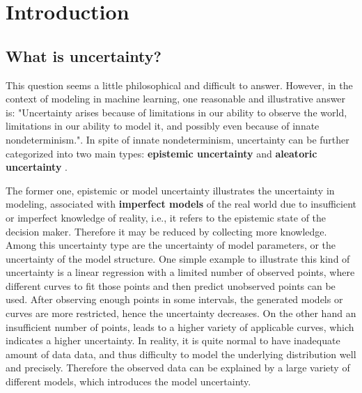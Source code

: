 \chapter{Introduction}
\setcounter{page}{1}%
\thispagestyle{empty}

\section{What is uncertainty?}
This question seems a little philosophical and difficult to answer. However, in the context of modeling in machine learning, one reasonable and illustrative answer is: "Uncertainty arises because of limitations in our ability to observe the world, limitations in our ability to model it, and possibly even because of innate nondeterminism."\cite{koller2009probabilistic}. In spite of innate nondeterminism, uncertainty can be further categorized into two main types: \textbf{epistemic uncertainty} and \textbf{aleatoric uncertainty} \cite{der2009aleatory, senge2014reliable, kendall2017uncertainties}. 

The former one, epistemic or model uncertainty illustrates the uncertainty in modeling, associated with \textbf{imperfect models} of the real world due to insufficient or imperfect knowledge of reality, i.e., it refers to the epistemic state of the decision maker.
Therefore it may be reduced by collecting more knowledge. Among this uncertainty type are the uncertainty of model parameters, or the uncertainty of the model structure.%
One simple example to illustrate this kind of uncertainty is a linear regression with a limited number of observed points, where different curves to fit those points and then predict unobserved points can be used. After observing enough points in some intervals, the generated models or curves are more restricted, hence the uncertainty decreases. On the other hand an insufficient number of points, leads to a higher variety of applicable curves, which indicates a higher uncertainty.  In reality, it is quite normal to have inadequate amount of data data, and thus difficulty to model the underlying distribution well and precisely. Therefore the observed data can be explained by a large variety of different models, which introduces the model uncertainty.

